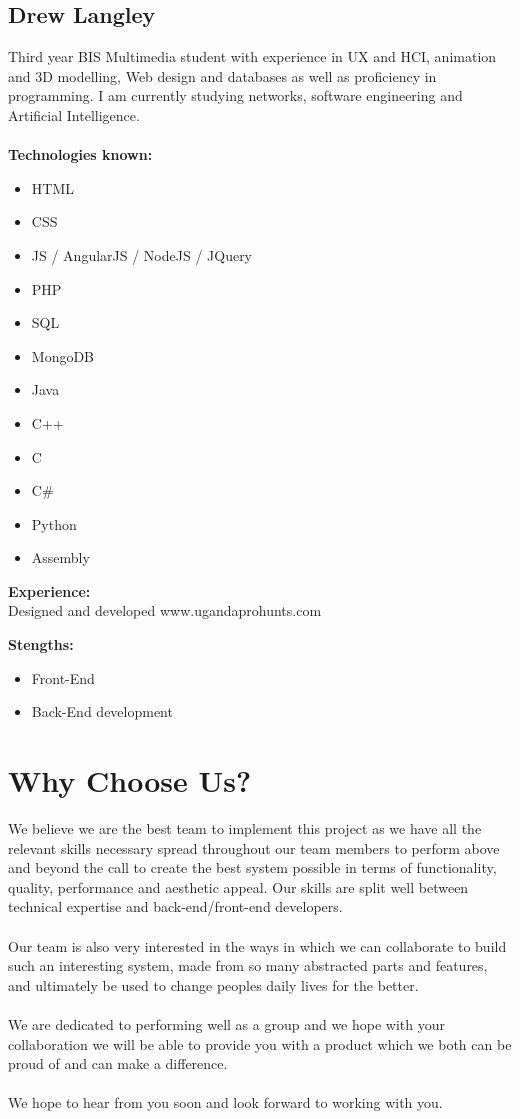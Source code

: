 \documentclass{article}
\begin{document}
\subsection {Drew Langley}
Third year BIS Multimedia student with experience in UX and HCI, animation and 3D modelling, Web design and databases as well as proficiency in programming. I am currently studying networks, software engineering and Artificial Intelligence. \\ \\
\textbf{Technologies known:}
\begin{itemize}
	\item HTML
	\item CSS 
	\item JS / AngularJS / NodeJS / JQuery 
	\item PHP 
	\item SQL
	\item MongoDB
	\item Java 
	\item C++ 
	\item C 
	\item C\# 
	\item Python 
	\item Assembly
\end{itemize}
\textbf{Experience:} \\
Designed and developed www.ugandaprohunts.com

\textbf{Stengths:} 
\begin{itemize}
	\item Front-End
	\item Back-End development
\end{itemize}

\newpage
\section{Why Choose Us?}
	We believe we are the best team to implement this project as we have all the relevant skills necessary spread throughout our team members to perform above and beyond the call to create the best system possible in terms of functionality, quality, performance and aesthetic appeal. Our skills are split well between technical expertise and back-end/front-end developers.\\ \\
	Our team is also very interested in the ways in which we can collaborate to build such an interesting system, made from so many abstracted parts and features, and ultimately be used to change peoples daily lives for the better.\\ \\
	We are dedicated to performing well as a group and we hope with your collaboration we will be able to provide you with a product which we both can be proud of and can make a difference. \\ \\
    We hope to hear from you soon and look forward to working with you.
\end{document}

